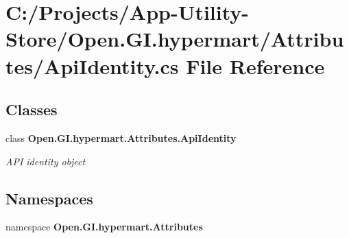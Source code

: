 \section{C\+:/\+Projects/\+App-\/\+Utility-\/\+Store/\+Open.G\+I.\+hypermart/\+Attributes/\+Api\+Identity.cs File Reference}
\label{_api_identity_8cs}
\subsection*{Classes}
\begin{DoxyCompactItemize}
\item 
class \textbf{ Open.\+G\+I.\+hypermart.\+Attributes.\+Api\+Identity}
\begin{DoxyCompactList}\small\item\em A\+PI identity object \end{DoxyCompactList}\end{DoxyCompactItemize}
\subsection*{Namespaces}
\begin{DoxyCompactItemize}
\item 
namespace \textbf{ Open.\+G\+I.\+hypermart.\+Attributes}
\end{DoxyCompactItemize}
